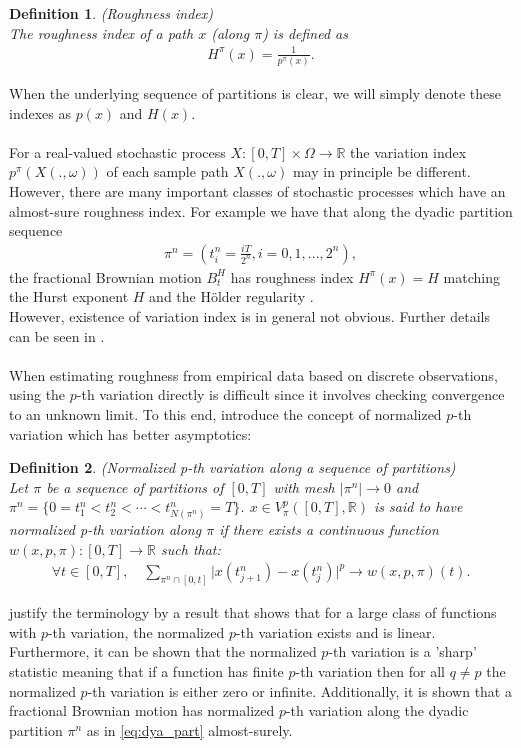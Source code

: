 \documentclass{article}
\newtheorem{definition}{Definition}
\begin{document}
\begin{definition}
\textnormal{(Roughness index)}\\
The roughness index of a path $x$ (along $\pi$) is defined as
\begin{align*}
H^{\pi}(x) = \frac{1}{p^{\pi}(x)}.
\end{align*}
\label{def:rough_index}
\end{definition}
When the underlying sequence of partitions is clear, we will simply denote these indexes as $p(x)$ and $H(x)$. \\\\
For a real-valued stochastic process $X: [0,T]\times \Omega \rightarrow \mathbb{R}$ the variation index $p^\pi (X(.,\omega))$ of each sample path $X(.,\omega)$ may in principle be different. However, there are many important classes of stochastic processes which have an almost-sure roughness index. For example we have that along the dyadic partition sequence 
\begin{align}
\pi^n = \left( t_i^n = \frac{iT}{2^n}, i=0,1,...,2^n \right), \label{eq:dya_part}
\end{align}
the fractional Brownian motion $B_t^H$ has roughness index $H^\pi(x) = H$  matching the Hurst exponent $H$ and the Hölder regularity \cite{cont}.\\
However, existence of variation index is in general not obvious. Further details can be seen in \cite{han2022hurst}.\\\\
When estimating roughness from empirical data based on discrete observations, using the $p$-th variation directly is difficult since it involves checking convergence to an unknown limit. To this end, \cite{cont} introduce the concept of normalized $p$-th variation which has better asymptotics:
\begin{definition}
\textnormal{(Normalized p-th variation along a sequence of partitions)}\\
Let $\pi$ be a sequence of partitions of $[0, T]$ with mesh $\lvert \pi^n \rvert \to 0$ and 
$\pi^n = \{ 0 = t_1^n < t_2^n < \cdots < t_{N(\pi^n)}^n = T \}$. 
$x \in V_{\pi}^p([0, T], \mathbb{R})$ is said to have normalized p-th variation along $\pi$ 
if there exists a continuous function $w(x, p, \pi) : [0, T] \to \mathbb{R}$ such that:
\begin{align*}
\forall t \in [0, T], \quad \sum_{\pi^n \cap [0,t]} \lvert x(t_{j+1}^n) - x(t_j^n) \rvert^p \to w(x, p, \pi)(t).
\end{align*}
\label{def:norm_pth_var}
\end{definition}
\cite{cont} justify the terminology by a result that shows that for a large class of functions with $p$-th variation, the normalized $p$-th variation exists and is linear. Furthermore, it can be shown that the normalized $p$-th variation is a 'sharp' statistic meaning that if a function has finite $p$-th variation then for all $q\neq p$ the normalized $p$-th variation is either zero or infinite. Additionally, it is shown that a fractional Brownian motion has normalized $p$-th variation along the dyadic partition $\pi^n$ as in \eqref{eq:dya_part} almost-surely.
\end{document}
